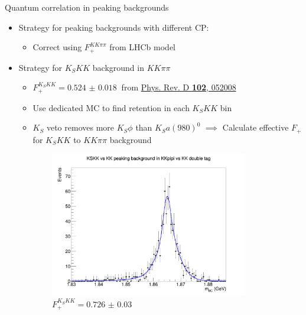 \documentclass{beamer}
\begin{document}
\begin{frame}{Quantum correlation in peaking backgrounds}
  \begin{itemize}
    \item{Strategy for peaking backgrounds with different CP:}
    \begin{itemize}
      \item{Correct using $F_+^{KK\pi\pi}$ from LHCb model}
    \end{itemize}
    \item{Strategy for $K_SKK$ background in $KK\pi\pi$}
    \begin{itemize}
      \item{$F_+^{K_SKK} = \SI{0.524(18)}{}$ from \href{https://arxiv.org/abs/2007.07959}{Phys. Rev. D \textbf{102}, 052008}}
      \item{Use dedicated MC to find retention in each $K_SKK$ bin}
      \item{$K_S$ veto removes more $K_S\phi$ than $K_Sa(980)^0$ $\implies$ Calculate effective $F_+$ for $K_SKK$ to $KK\pi\pi$ background}
    \end{itemize}
  \end{itemize}
  \begin{figure}
    \centering
    \begin{subfigure}{0.5\textwidth}
      \centering
      \includegraphics[width=0.95\textwidth]{Plots/KSKK_to_KKpipi_vs_KK_DoubleTag_FitPlot.png}
      \caption{$F_+^{K_SKK} = \SI{0.726(30)}{}$}
    \end{subfigure}%
    \begin{subfigure}{0.5\textwidth}
      \centering

\end{subfigure}
\end{figure}
\end{frame}
\end{document}
